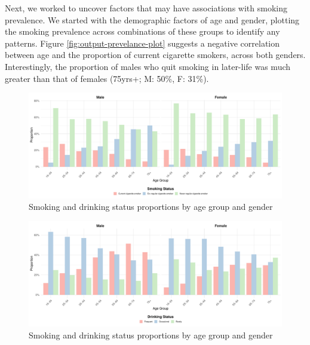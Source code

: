 \documentclass[
  11pt,
  twocolumn]{article}
\begin{document}
Next, we worked to uncover factors that may have associations with
smoking prevalence. We started with the demographic factors of age and
gender, plotting the smoking prevalence across combinations of these
groups to identify any patterns. Figure \ref{fig:output-prevelance-plot}
suggests a negative correlation between age and the proportion of
current cigarette smokers, across both genders. Interestingly, the
proportion of males who quit smoking in later-life was much greater than
that of females (75yrs+; M: 50\%, F: 31\%).

\begin{figure}[H]
\includegraphics{Coursework_files/figure-latex/output-smoking-drinking-age-plot-1} \caption{Smoking and drinking status proportions by age group and gender}\label{fig:output-smoking-drinking-age-plot-1}
\end{figure}
\begin{figure}[H]
\includegraphics{Coursework_files/figure-latex/output-smoking-drinking-age-plot-2} \caption{Smoking and drinking status proportions by age group and gender}\label{fig:output-smoking-drinking-age-plot-2}
\end{figure}
\end{document}
